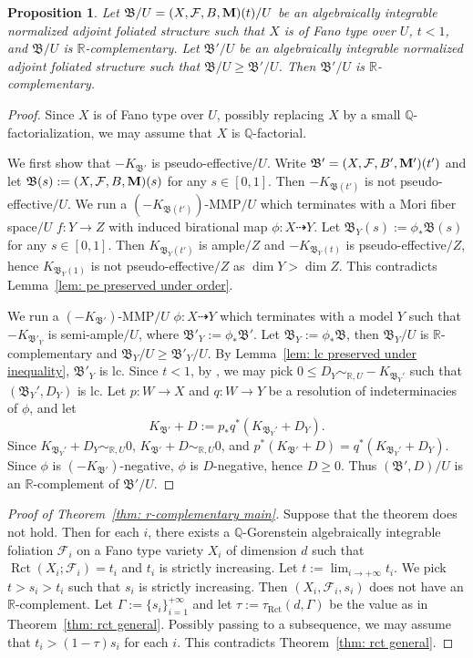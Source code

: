 \documentclass[11pt,reqno]{amsart}
\numberwithin{equation}{section}
\newcommand{\Mm}{{\bf{M}}}
\newcommand{\Rct}{\operatorname{Rct}}
\newcommand{\Bb}{{\mathfrak{B}}}
\newcommand{\Ff}{\mathcal{F}}
\newcommand{\Ii}{\Gamma}
\newtheorem{prop}[thm]{Proposition}
\theoremstyle{definition}
\begin{document}
\begin{prop}\label{prop: r complementary preserved under inequality}
Let $\Bb/U=(X,\Ff,B,\Mm)(t)/U$ be an algebraically integrable normalized adjoint foliated structure such that $X$ is of Fano type over $U$, $t<1$, and $\Bb/U$ is $\mathbb R$-complementary. Let $\Bb'/U$ be an algebraically integrable normalized adjoint foliated structure such that $\Bb/U\geq\Bb'/U$. Then $\Bb'/U$ is $\mathbb R$-complementary.
\end{prop}
\begin{proof}
Since $X$ is of Fano type over $U$, possibly replacing $X$ by a small $\mathbb Q$-factorialization, we may assume that $X$ is $\mathbb Q$-factorial. 

We first show that $-K_{\Bb'}$ is pseudo-effective$/U$. Write $\Bb'=(X,\Ff,B',\Mm')(t')$ and let $\Bb(s):=(X,\Ff,B,\Mm)(s)$ for any $s\in [0,1]$. Then $-K_{\Bb(t')}$ is not pseudo-effective$/U$. We run a $(-K_{\Bb(t')})$-MMP$/U$ which terminates with a Mori fiber space$/U$ $f: Y\rightarrow Z$ with induced birational map $\phi\colon X\dashrightarrow Y$. Let $\Bb_Y(s):=\phi_*\Bb(s)$ for any $s\in [0,1]$. Then $K_{\Bb_Y(t')}$ is ample$/Z$ and $-K_{\Bb_Y(t)}$ is pseudo-effective$/Z$, hence $K_{\Bb_Y(1)}$ is not pseudo-effective$/Z$ as $\dim Y>\dim Z$. This contradicts Lemma~\ref{lem: pe preserved under order}.

We run a $(-K_{\Bb'})$-MMP$/U$ $\phi\colon X\dashrightarrow Y$ which terminates with a model $Y$ such that $-K_{\Bb'_Y}$ is semi-ample$/U$, where $\Bb'_Y:=\phi_*\Bb'$. Let $\Bb_Y:=\phi_*\Bb$, then $\Bb_Y/U$ is $\mathbb R$-complementary and $\Bb_Y/U\geq\Bb'_Y/U$. By Lemma~\ref{lem: lc preserved under inequality}, $\Bb'_Y$ is lc. Since $t<1$, by \cite[Theorem~3.28]{Cas+25a}, we may pick $0\leq D_Y\sim_{\mathbb R,U}-K_{\Bb_Y'}$ such that $(\Bb_Y',D_Y)$ is lc. Let $p\colon W\rightarrow X$ and $q\colon W\rightarrow Y$ be a resolution of indeterminacies of $\phi$, and let 
       $$K_{\Bb'}+D:=p_{*}q^*(K_{\Bb_Y'}+D_Y).$$
       Since $K_{\Bb_Y'}+D_Y\sim_{\mathbb R,U}0$, $K_{\Bb'}+D\sim_{\mathbb R,U}0$, and $p^*(K_{\Bb'}+D)=q^*(K_{\Bb_Y'}+D_Y)$. Since $\phi$ is $(-K_{\Bb'})$-negative, $\phi$ is $D$-negative, hence $D\geq 0$. Thus $(\Bb',D)/U$ is an $\mathbb R$-complement of $\Bb'/U$.
\end{proof}

\begin{proof}[Proof of Theorem~\ref{thm: r-complementary main}]
    Suppose that the theorem does not hold. Then for each $i$, there exists a $\mathbb Q$-Gorenstein algebraically integrable foliation $\Ff_i$ on a Fano type variety $X_i$ of dimension $d$ such that $\Rct(X_i;\Ff_i)=t_i$ and $t_i$ is strictly increasing. Let $t:=\lim_{i\rightarrow+\infty}t_i$. We pick $t>s_i>t_i$ such that $s_i$ is strictly increasing. Then $(X_i,\Ff_i,s_i)$ does not have an $\mathbb R$-complement. Let $\Ii:=\{s_i\}_{i=1}^{+\infty}$ and let $\tau:=\tau_{\Rct}(d,\Ii)$ be the value as in Theorem~\ref{thm: rct general}. Possibly passing to a subsequence, we may assume that $t_i>(1-\tau)s_i$ for each $i$. This contradicts Theorem~\ref{thm: rct general}.
\end{proof}
\end{document}

